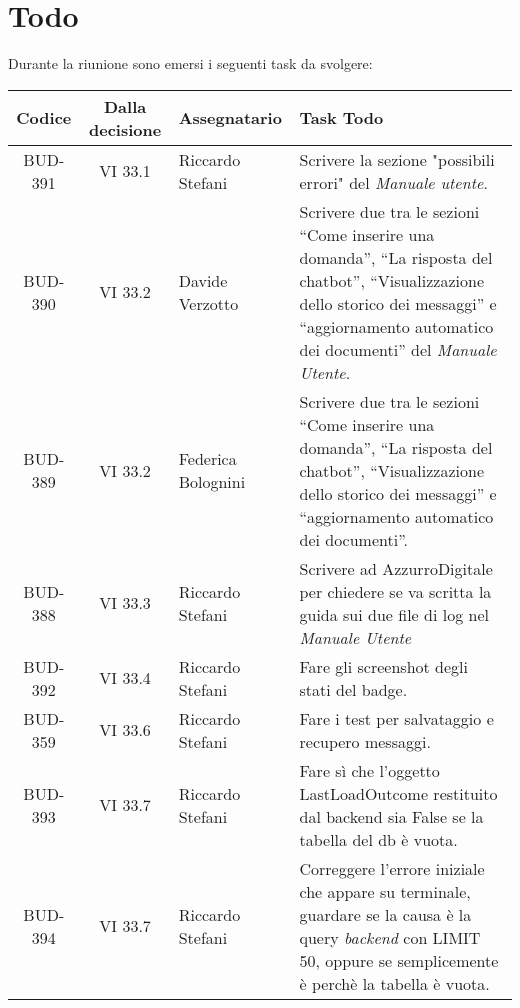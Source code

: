 
\section{Todo}

Durante la riunione sono emersi i seguenti task da svolgere:

\vspace{0.5cm}

\begin{table}[htbp]
\centering
{}
\begin{tabular}{|c|c|p{}|p{}|}
    \hline
    \rowcolor[gray]{0.75}
    \textbf{Codice} & \textbf{Dalla decisione} & \textbf{Assegnatario} & \textbf{Task Todo} \\
    \hline
    BUD-391 & VI 33.1 & Riccardo Stefani & Scrivere la sezione "possibili errori" del \emph{Manuale utente}.\\
    \hline
    BUD-390 & VI 33.2 & Davide Verzotto & Scrivere due tra le sezioni “Come inserire una domanda”, “La risposta del chatbot”, “Visualizzazione dello storico dei messaggi” e “aggiornamento automatico dei documenti” del \emph{Manuale Utente}.\\
    \hline
    BUD-389 & VI 33.2 & Federica Bolognini & Scrivere due tra le sezioni “Come inserire una domanda”, “La risposta del chatbot”, “Visualizzazione dello storico dei messaggi” e “aggiornamento automatico dei documenti”. \\
    \hline 
    BUD-388 & VI 33.3 & Riccardo Stefani & Scrivere ad AzzurroDigitale per chiedere se va scritta la guida sui due file di log nel \emph{Manuale Utente} \\
    \hline
    BUD-392 & VI 33.4 & Riccardo Stefani & Fare gli screenshot degli stati del badge. \\
    \hline
    BUD-359 & VI 33.6 & Riccardo Stefani & Fare i test per salvataggio e recupero messaggi. \\
    \hline
    BUD-393 & VI 33.7 & Riccardo Stefani & Fare sì che l’oggetto LastLoadOutcome restituito dal backend sia False se la tabella del db è vuota. \\
    \hline
    BUD-394 & VI 33.7 & Riccardo Stefani & Correggere l’errore iniziale che appare su terminale, guardare se la causa è la query \emph{backend} con LIMIT 50, oppure se semplicemente è perchè la tabella è vuota. \\

\end{tabular}
\end{table}

